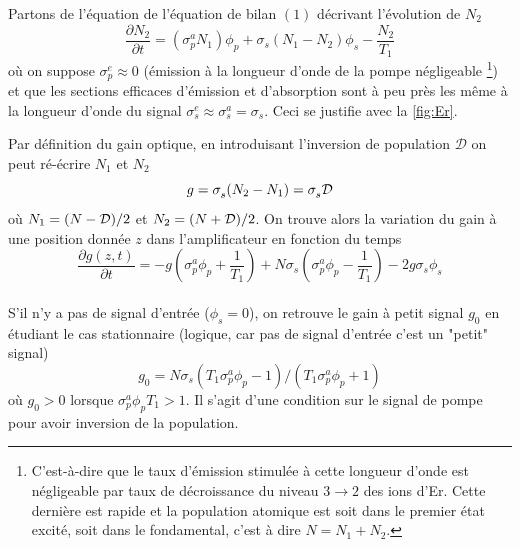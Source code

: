 Partons de l'équation de l'équation de bilan $(1)$ décrivant l'évolution de $N_2$
\begin{equation}
\frac{{\partial {N_2}}}{{\partial t}} = (\sigma _p^a{N_1}){\phi _p} + \sigma _s^{}({N_1} - {N_2}){\phi 
_s} - \frac{{{N_2}}}{{{T_1}}}
\end{equation}
où on suppose $\sigma_p^e\approx0$ (émission à la longueur d'onde de la pompe négligeable
\footnote{C'est-à-dire que le taux d'émission stimulée à cette longueur d'onde est négligeable par  
taux de décroissance du niveau $3\to2$ des ions d'Er. Cette dernière est rapide et la population 
atomique est soit dans le premier état excité, soit dans le fondamental, c'est à dire $N=N_1+N_2$.}) 
et que les sections efficaces d'émission et d'absorption sont à peu près les même à la longueur d'onde
du signal $\sigma _s^e \approx \sigma _s^a = \sigma _s^{}$. Ceci se justifie avec la \autoref{fig:Er}.

Par définition du gain optique, en introduisant l'inversion de population $\mathcal{D}$ on peut 
ré-écrire $N_1$ et $N_2$
\begin{equation}
g = \sigma _s^{}({N_2} - {N_1}) = \sigma _s^{}{\cal D}
\end{equation}
où ${N_1} = (N - {\cal D})/2$ et ${N_2} = (N + {\cal D})/2$. On trouve alors la variation du gain
à une position donnée $z$ dans l'amplificateur en fonction du temps
\begin{equation}
\frac{{\partial g(z,t)}}{{\partial t}} =  - g(\sigma _p^a{\phi _p} + \frac{1}{{{T_1}}}) + N\sigma
_s^{}(\sigma _p^a{\phi _p} - \frac{1}{{{T_1}}}) - 2g\sigma _s^{}{\phi _s}
\end{equation}\ \\

S'il n'y a pas de signal d'entrée ($\phi_s=0$), on retrouve le gain à petit signal $g_0$ en étudiant
le cas stationnaire (logique, car pas de signal d'entrée c'est un "petit" signal)
\begin{equation}
{g_0} = N\sigma _s^{}({T_1}\sigma _p^a{\phi _p} - 1)/({T_1}\sigma _p^a{\phi _p} + 1)
\end{equation}
où $g_0>0$ lorsque $\sigma _p^a{\phi _p}{T_1} > 1$. Il s'agit d'une condition sur le signal de 
pompe pour avoir inversion de la population. \\

